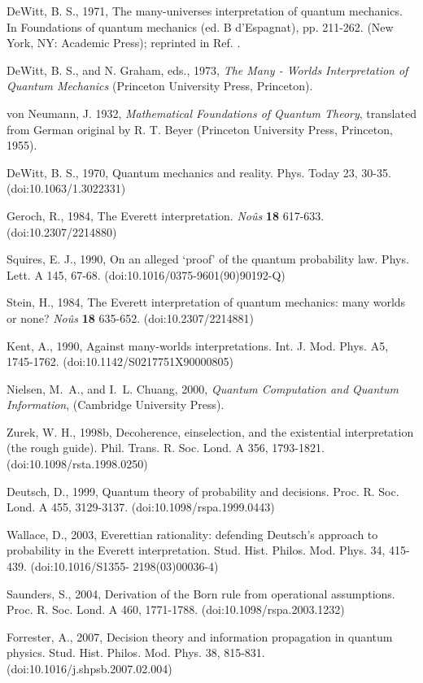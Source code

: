 \documentclass[aps,amsmath,amssymb,amsfonts,floatfix]{revtex4-1}
\newcommand{\+}         {\dagger}
\begin{document}
{{{\begin{references}
 DeWitt,  B. S., 1971, The many-universes interpretation of quantum mechanics. In Foundations
of quantum mechanics (ed. B d'Espagnat), pp. 211-262. (New York, NY: Academic Press); reprinted in Ref. \cite{22}.

 DeWitt, B. S., and N. Graham, eds., 1973, {\it The Many - Worlds Interpretation
of Quantum Mechanics} (Princeton University Press, Princeton).

 von Neumann, J. 1932, {\it Mathematical Foundations of Quantum Theory},
translated from German original by R. T. Beyer (Princeton University Press, Princeton, 1955).

 DeWitt,  B. S., 1970, Quantum mechanics and reality. Phys. Today 23, 30-35.
(doi:10.1063/1.3022331)

 Geroch, R., 1984, The Everett interpretation. {\it No\^us} {\bf 18} 617-633. (doi:10.2307/2214880)

 Squires, E. J., 1990, On an alleged `proof' of the quantum probability law. Phys. Lett. A 145, 67-68.
(doi:10.1016/0375-9601(90)90192-Q)

 Stein, H., 1984, The Everett interpretation of quantum mechanics: many worlds or none? {\it No\^us} {\bf 18} 635-652. (doi:10.2307/2214881)

 Kent, A., 1990, Against many-worlds interpretations. Int. J. Mod. Phys. A5, 1745-1762.
(doi:10.1142/S0217751X90000805)

 Nielsen, M.~A., and I.~L. Chuang,  2000, {\it Quantum Computation and Quantum Information}, (Cambridge University Press).

 Zurek, W. H.,  1998b, Decoherence, einselection, and the existential interpretation (the rough
guide). Phil. Trans. R. Soc. Lond. A 356, 1793-1821. (doi:10.1098/rsta.1998.0250)

 Deutsch, D., 1999, Quantum theory of probability and decisions. Proc. R. Soc. Lond. A 455,
3129-3137. (doi:10.1098/rspa.1999.0443)

 Wallace, D., 2003, Everettian rationality: defending Deutsch's approach to probability in
the Everett interpretation. Stud. Hist. Philos. Mod. Phys. 34, 415-439. (doi:10.1016/S1355-
2198(03)00036-4)

 Saunders, S., 2004, Derivation of the Born rule from operational assumptions. Proc. R. Soc. Lond.
A 460, 1771-1788. (doi:10.1098/rspa.2003.1232)

 Forrester, A., 2007, Decision theory and information propagation in quantum physics. Stud.
Hist. Philos. Mod. Phys. 38, 815-831. (doi:10.1016/j.shpsb.2007.02.004)
 

\end{references}}}}
\end{document}
